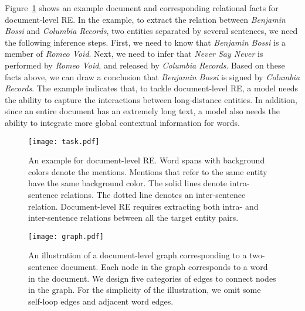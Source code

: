 \documentclass[letterpaper]{article} \usepackage{aaai21}  \usepackage{times}  \usepackage{helvet} \usepackage{courier}  \usepackage[hyphens]{url}  \usepackage{graphicx} \urlstyle{rm} \def\UrlFont{\rm}  \usepackage{natbib}  \usepackage{caption} \frenchspacing  \setlength{\pdfpagewidth}{8.5in}  \setlength{\pdfpageheight}{11in}
\begin{document}
Figure~\ref{fig:task} shows an example document and corresponding relational facts for document-level RE. 
In the example, to extract the relation between \textit{Benjamin Bossi} and \textit{Columbia Records}, two entities separated by several sentences, we need the following inference steps. 
First, we need to know that \textit{Benjamin Bossi} is a member of \textit{Romeo Void}. 
Next, we need to infer that \textit{Never Say Never} is performed by \textit{Romeo Void}, and released by \textit{Columbia Records}. 
Based on these facts above, we can draw a conclusion that \textit{Benjamin Bossi} is signed by \textit{Columbia Records}. 
The example indicates that, to tackle document-level RE, a model needs the ability to capture the interactions between long-distance entities. 
In addition, since an entire document has an extremely long text, a model also needs the ability to integrate more global contextual information for words. 

\begin{figure}[t]
\centering
\texttt{[image: task.pdf]}
\caption{
An example for document-level RE. 
Word spans with background colors denote the mentions. 
Mentions that refer to the same entity have the same background color.
The solid lines denote intra-sentence relations. 
The dotted line denotes an inter-sentence relation. 
Document-level RE requires extracting both intra- and inter-sentence relations between all the target entity pairs. 
}
\label{fig:task}
\end{figure}

\begin{figure*}[t]
\centering
\texttt{[image: graph.pdf]}
\caption{
An illustration of a document-level graph corresponding to a two-sentence document. 
Each node in the graph corresponds to a word in the document. 
We design five categories of edges to connect nodes in the graph. 
For the simplicity of the illustration, we omit some self-loop edges and adjacent word edges. 
}
\label{fig:graph}
\end{figure*}
 
\end{document}
